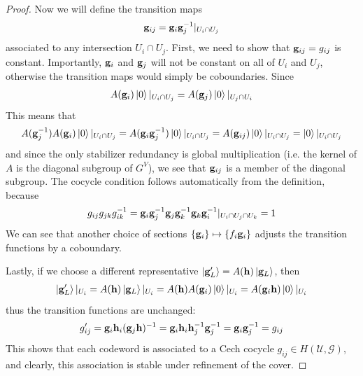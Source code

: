 \documentclass[11pt]{article}
\theoremstyle{definition}
\begin{document}
\begin{proof}
  Now we will define the transition maps
  \begin{align}
    \vb g_{ij} = \vb g_i\vb g_j^{-1}|_{U_i \cap U_j}
  \end{align}
  associated to any intersection $U_i \cap U_j$. 
  First, we need to show that
  $\vb g_{ij} = g_{ij}$ is constant. Importantly, $\vb g_i$ and $\vb g_j$ will
  not be constant on all of $U_i$ and $U_j$, otherwise the transition maps would
  simply be coboundaries. Since
  \begin{align}
    A(\vb g_i)\ket{0}|_{U_i\cap U_j} = 
    A(\vb g_j)\ket{0}|_{U_j\cap U_i}
  \end{align}
  This means that 
  \begin{align}
    A(\vb g_j^{-1})A(\vb g_i)\ket{0}|_{U_i\cap U_j} = A(\vb g_i \vb g_j^{-1})\ket{0}|_{U_i \cap U_j}
= A(\vb g_{ij})\ket{0}|_{U_i \cap U_j}
    = \ket{0}|_{U_i \cap U_j}
  \end{align}
  and since the only stabilizer redundancy is global multiplication (i.e. the
  kernel of $A$ is the diagonal subgroup of $G^{V}$), we see that $\vb g_{ij}$
  is a member of the diagonal subgroup. The cocycle condition follows
  automatically from the definition, because
  \begin{align}
    g_{ij}g_{jk}g_{ik}^{-1} = \vb g_i \vb g_j^{-1} \vb g_j \vb g_k^{-1} \vb g_k \vb g_i^{-1}|_{U_i \cap U_j \cap U_k} = 1
  \end{align}
  We can see that another choice of sections $\{\vb g_i\} \mapsto \{f_i \vb
  g_i\}$ adjusts the transition functions by a coboundary.

  Lastly, if we
  choose a different representative $\ket{\vb g_L'} = A(\vb h)\ket{\vb g_L}$,
  then
  \begin{align}
    \ket{\vb g_L'}|_{U_i} = A(\vb h)\ket{\vb g_L}|_{U_i} = A(\vb h)A(\vb g_i)\ket{0}|_{U_i} = A(\vb g_i \vb h)\ket{0}|_{U_i}
  \end{align}
 thus the transition functions are unchanged:
 \begin{align}
   g_{ij}' = \vb g_i \vb h_i (\vb g_j\vb h)^{-1} = \vb g_i \vb h_i \vb h_j^{-1} \vb g_j^{-1} = \vb g_i \vb g_j^{-1} = g_{ij}
 \end{align}
This shows that each codeword is associated to a Cech cocycle $g_{ij} \in
H(\mathcal U, \mathcal G)$, and clearly, this association is stable under
refinement of the cover.


\end{proof}
\end{document}
